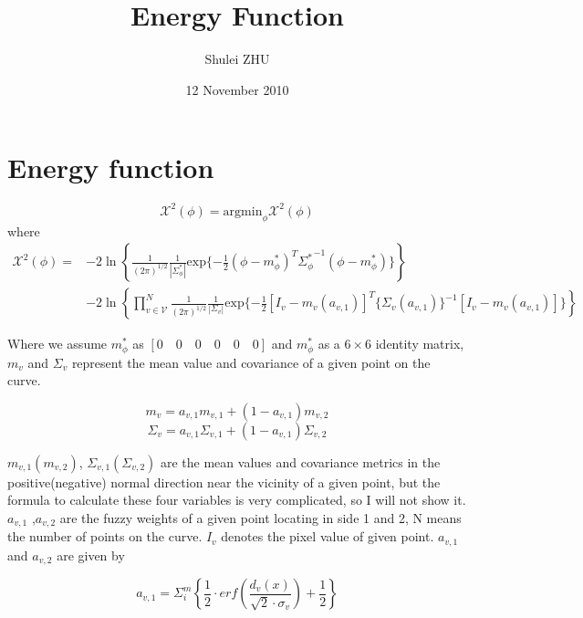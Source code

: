 \documentclass[11pt]{article}
\title{Energy Function}
\author{Shulei ZHU}
\date{12 November 2010}
\begin{document}
\maketitle

\setcounter{tocdepth}{2}
\tableofcontents
\vspace*{1cm}

\section{Energy function}
\label{sec-1}

\begin{displaymath}
\mathcal{X}^2(\phi) = \mathrm{argmin}_{\phi} \mathcal{X}^2(\phi)
\end{displaymath}
where 
\begin{align*}
\mathcal{X}^2(\phi) = & -2\ln \left\{ {\frac{1}{{(2\pi)}^{1/2}}}
\frac{1}{|\Sigma_{\phi}^{*}|} \mathrm{exp}\{-\frac{1}{2}{(\phi-m_{\phi}^{*})^T{\Sigma_{\phi}^{*}}^{-1}(\phi-m_{\phi}^{*})}\}
\right\}  \\ & - 2 \ln \left\{ \prod_{v \in \mathcal{V}}^{N} {\frac{1}{(2\pi)^{1/2}}
\frac{1}{|\Sigma_v|} \mathrm{exp}\{-\frac{1}{2}
{\left[I_{v}-m_v(a_{v,1})\right]^T\{\Sigma_{v}(a_{v,1})\}^{-1}\left[I_{v}-m_v(a_{v,1})\right]}
}\} \right\}
\end{align*}

Where we assume $m_{\phi}^{*}$ as $\left[0 \quad 0 \quad 0 \quad 0 \quad 0 \quad 0 \right]$ and $m_{\phi}^{*}$ as a $6 \times 6$ identity
matrix, $m_v$ and $\Sigma_{v}$ represent the mean value and covariance
of a given point on the curve.

\begin{displaymath}
m_v = a_{v,1} m_{v,1} + (1- a_{v,1}) m_{v,2}
\end{displaymath}
\begin{displaymath}
\Sigma_{v} = a_{v,1} \Sigma_{v,1} + (1- a_{v,1}) \Sigma_{v,2}
\end{displaymath}

$m_{v,1}(m_{v,2})$, $\Sigma_{v,1}(\Sigma_{v,2})$ are the mean
values and covariance metrics in the positive(negative) normal
direction near the vicinity of a given point, but the formula to
calculate these four variables is very complicated, so I will not show
it. $a_{v,1}$ ,$a_{v,2}$ are the fuzzy weights of a
given point locating in side 1 and 2, N means the number of points on
the curve. $I_v$ denotes the pixel value of given point. $a_{v,1}$ and
$a_{v,2}$ are given by

\begin{displaymath}
a_{v,1} = \Sigma_{i}^{m} \left\{ \frac{1}{2}\cdot
erf(\frac{d_v(x)}{\sqrt{2}\cdot\sigma_v}) + \frac{1}{2}\right\}
\end{displaymath}
\end{document}
